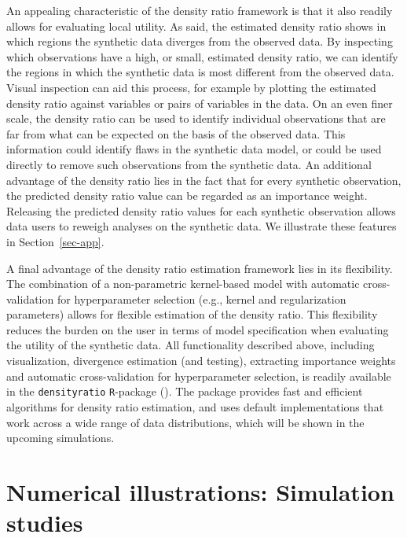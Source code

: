 \documentclass[
]{article}
\begin{document}
An appealing characteristic of the density ratio framework is that it
also readily allows for evaluating local utility. As said, the estimated
density ratio shows in which regions the synthetic data diverges from
the observed data. By inspecting which observations have a high, or
small, estimated density ratio, we can identify the regions in which the
synthetic data is most different from the observed data. Visual
inspection can aid this process, for example by plotting the estimated
density ratio against variables or pairs of variables in the data. On an
even finer scale, the density ratio can be used to identify individual
observations that are far from what can be expected on the basis of the
observed data. This information could identify flaws in the synthetic
data model, or could be used directly to remove such observations from
the synthetic data. An additional advantage of the density ratio lies in
the fact that for every synthetic observation, the predicted density
ratio value can be regarded as an importance weight. Releasing the
predicted density ratio values for each synthetic observation allows
data users to reweigh analyses on the synthetic data. We illustrate
these features in Section~\ref{sec-app}.

A final advantage of the density ratio estimation framework lies in its
flexibility. The combination of a non-parametric kernel-based model with
automatic cross-validation for hyperparameter selection (e.g., kernel
and regularization parameters) allows for flexible estimation of the
density ratio. This flexibility reduces the burden on the user in terms
of model specification when evaluating the utility of the synthetic
data. All functionality described above, including visualization,
divergence estimation (and testing), extracting importance weights and
automatic cross-validation for hyperparameter selection, is readily
available in the \texttt{densityratio} \texttt{R}-package
(). The package provides fast
and efficient algorithms for density ratio estimation, and uses default
implementations that work across a wide range of data distributions,
which will be shown in the upcoming simulations.

\section{Numerical illustrations: Simulation
studies}\label{numerical-illustrations-simulation-studies}
\end{document}

